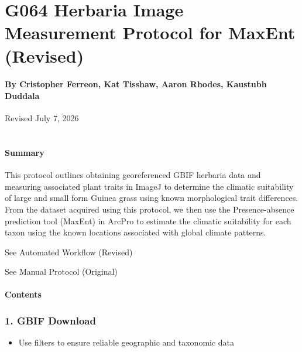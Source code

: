 \documentclass[
]{article}
\author{}
\date{\vspace{-2.5em}}
\providecommand{\tightlist}{%
  \setlength{\itemsep}{0pt}\setlength{\parskip}{0pt}}
\begin{document}
\section{G064 Herbaria Image Measurement Protocol for MaxEnt
(Revised)}\label{g064-herbaria-image-measurement-protocol-for-maxent-revised}

\paragraph{By Cristopher Ferreon, Kat Tisshaw, Aaron Rhodes, Kaustubh
Duddala}\label{by-cristopher-ferreon-kat-tisshaw-aaron-rhodes-kaustubh-duddala}

Revised July 7, 2026

\section{}\label{section}

\paragraph{Summary}\label{summary}

This protocol outlines obtaining georeferenced GBIF herbaria data and
measuring associated plant traits in ImageJ to determine the climatic
suitability of large and small form Guinea grass using known
morphological trait differences. From the dataset acquired using this
protocol, we then use the Presence-absence prediction tool (MaxEnt) in
ArcPro to estimate the climatic suitability for each taxon using the
known locations associated with global climate patterns.

See Automated Workflow (Revised)

See Manual Protocol (Original)

\paragraph{Contents}\label{contents}

\subsubsection{1. GBIF Download}\label{gbif-download}

\begin{itemize}
\tightlist
\item
  Use filters to ensure reliable geographic and taxonomic data
\end{itemize}
\end{document}
